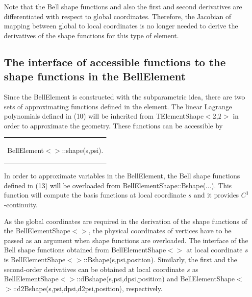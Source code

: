 Note that the Bell shape functions and also the first and second derivatives are differentiated with respect to global coordinates. Therefore, the Jacobian of mapping between global to local coordinates is no longer needed to derive the derivatives of the shape functions for this type of element.



\hypertarget{index_interface}{}\subsection{The interface of accessible functions to the shape functions in the Bell\+Element}\label{index_interface}
Since the {\ttfamily Bell\+Element} is constructed with the subparametric idea, there are two sets of approximating functions defined in the element. The linear Lagrange polynomials defined in (10) will be inherited from {\ttfamily T\+Element\+Shape$<$2,2$>$} in order to approximate the geometry. These functions can be accessible by

\begin{center} \tabulinesep=1mm
\begin{longtabu} spread 0pt [c]{*{1}{|X[-1]}|}
\hline
\begin{center} {\ttfamily Bell\+Element$<$$>$\+::shape(s,psi)}. \end{center}    \\
\end{longtabu}
\end{center} 

In order to approximate variables in the {\ttfamily Bell\+Element}, the Bell shape functions defined in (13) will be overloaded from {\ttfamily Bell\+Element\+Shape\+::\+Bshape}(...). This function will compute the basis functions at local coordinate $ s $ and it provides $ C^1 $-\/continuity.

As the global coordinates are required in the derivation of the shape functions of the {\ttfamily Bell\+Element\+Shape$<$$>$}, the physical coordinates of vertices have to be passed as an argument when shape functions are overloaded. The interface of the Bell shape functions obtained from {\ttfamily Bell\+Element\+Shape$<$$>$} at local coordinate $ s $ is {\ttfamily Bell\+Element\+Shape$<$$>$\+::\+Bshape(s,psi,position)}. Similarly, the first and the second-\/order derivatives can be obtained at local coordinate $ s $ as {\ttfamily Bell\+Element\+Shape$<$$>$\+::d\+Bshape(s,psi,dpsi,position)} and {\ttfamily Bell\+Element\+Shape$<$$>$\+::d2\+Bshape(s,psi,dpsi,d2psi,position)}, respectively.

